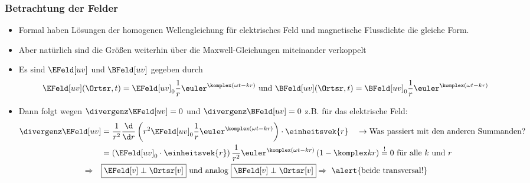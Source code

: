 \begin{frame}
  \frametitle{Betrachtung der Felder}
  \begin{itemize}[<+->]
  \item Formal haben Lösungen der homogenen Wellengleichung für elektrisches Feld und magnetische Flussdichte die \alert{gleiche Form}.
  \item Aber natürlich sind die Größen weiterhin über die Maxwell-Gleichungen miteinander \alert{verkoppelt}
  \item Es sind \(\EFeld[uv]\) und \(\BFeld[uv]\) gegeben durch
    \begin{equation*}
      \EFeld[uv](\Ortsr, t) = \EFeld[uv]_0 \frac{1}{r} \euler^{\komplex(\omega t - kr)} \text{ und } \BFeld[uv](\Ortsr, t) = \BFeld[uv]_0 \frac{1}{r} \euler^{\komplex(\omega t - kr)}
    \end{equation*}
  \item Dann folgt wegen \(\divergenz \EFeld[uv] = 0\) und \(\divergenz\BFeld[uv]=0\) z.B. für das elektrische Feld:
     \begin{align*}
      \divergenz \EFeld[uv]  & = \frac{1}{r^2} \frac{\d}{\d r} \left( r^2 \EFeld[uv]_0 \frac{1}{r} \euler^{\komplex(\omega t -kr)} \right) \cdot \einheitsvek{r} \quad\to\text{Was passiert mit den anderen Summanden?}\\
                             &= \left( \EFeld[uv]_0 \cdot \einheitsvek{r} \right) \frac{1}{r^2} \euler^{\komplex(\omega t -kr)} \left(1- \komplex kr \right) \stackrel{!}{=} 0 \text{ für alle } k \text{ und } r  \\
       \Rightarrow \quad & \boxed{\EFeld[v] \perp \Ortsr[v]} \text{ und analog } \boxed{\BFeld[v] \perp \Ortsr[v]} \Rightarrow \text{ \alert{beide transversal!}}
       \end{align*}
     \end{itemize}
  \end{frame}

